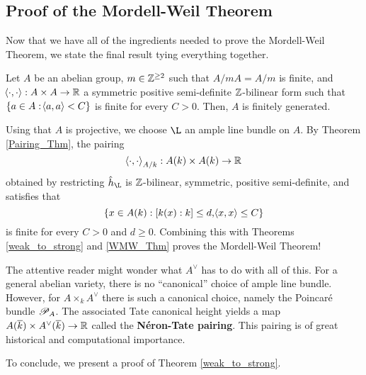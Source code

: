\documentclass[11pt]{article}
\begin{document}
\subsection{Proof of the Mordell-Weil Theorem}
Now that we have all of the ingredients needed to prove the Mordell-Weil Theorem, we state the final result tying everything together.

\begin{theorem}\label{weak_to_strong}
Let $A$ be an abelian group, $m\in\mathbb{Z}^{\geq2}$ such that $A/mA=A/m$ is finite, and $\!\left\langle\cdot,\cdot\right\rangle: A\times A\to\mathbb{R}$ a symmetric positive semi-definite $\mathbb{Z}$-bilinear form such that $\{a\in A : \!\left\langle a,a\right\rangle<C\}$ is finite for every $C>0$. Then, $A$ is finitely generated.
\end{theorem}

Using that $A$ is projective, we choose $\L$ an ample line bundle on $A$. By Theorem \ref{Pairing_Thm}, the pairing
$$\!\left\langle\cdot,\cdot\right\rangle_{A/k}: A(k)\times A(k)\to\mathbb{R}$$
obtained by restricting $\hat{h}_{\L}$ is $\mathbb{Z}$-bilinear, symmetric, positive semi-definite, and satisfies that
$$\{x\in A(k) : [k(x):k]\leq d,\!\left\langle x,x\right\rangle\leq C\}$$
is finite for every $C>0$ and $d\geq0$. Combining this with Theorems \ref{weak_to_strong} and \ref{WMW_Thm} proves the Mordell-Weil Theorem! 

\begin{remark}
The attentive reader might wonder what $A^{\vee}$ has to do with all of this. For a general abelian variety, there is no ``canonical'' choice of ample line bundle. However, for $A\times_kA^{\vee}$ there is such a canonical choice, namely the Poincar\'{e} bundle $\mathscr{P}_A$. The associated Tate canonical height yields a map $A(\overline{k})\times A^{\vee}(\overline{k})\to\mathbb{R}$ called the \textbf{N\'{e}ron-Tate pairing}. This pairing is of great historical and computational importance.
\end{remark}

To conclude, we present a proof of Theorem \ref{weak_to_strong}.
\end{document}
